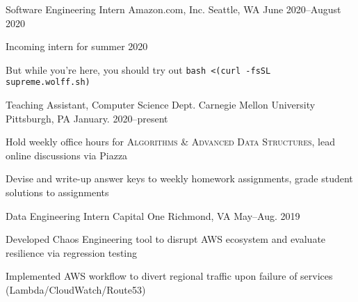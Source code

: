 \documentclass[10pt, letterpaper]{awesome-cv}
\begin{document}
\begin{cventries}

    \cventry
        {Software Engineering Intern}
        {Amazon.com, Inc.}
        {Seattle, WA}
        {June 2020--August 2020}
        {\begin{cvitems} 
            \item Incoming intern for summer 2020
            \item But while you're here, you should try out \lstinline{bash <(curl -fsSL supreme.wolff.sh)}
        \end{cvitems}}
        
    
    \cventry
        {Teaching Assistant, Computer Science Dept.}
        {Carnegie Mellon University}
        {Pittsburgh, PA}
        {January. 2020--present}
        {\begin{cvitems} 
            \item Hold weekly office hours for {\bodyfont\scshape\color{darktext} Algorithms \& Advanced Data Structures}, lead online discussions via Piazza
            \item Devise and write-up answer keys to weekly homework assignments, grade student solutions to assignments 
        \end{cvitems}}    
        
    \cventry
        {Data Engineering Intern}
        {Capital One}
        {Richmond, VA}
        {May--Aug. 2019}
        {\begin{cvitems} 
            \item Developed Chaos Engineering tool to disrupt AWS ecosystem and evaluate resilience via regression testing 
            \item Implemented AWS workflow to divert regional traffic upon failure of services (Lambda/CloudWatch/Route53)
        \end{cvitems}}
        

\end{cventries}
\end{document}
